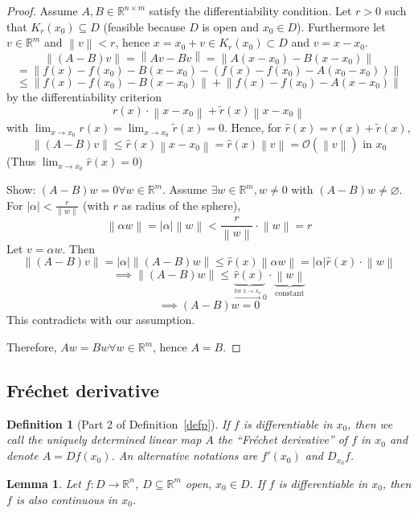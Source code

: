 \documentclass{article}
\newtheorem{definition}{Definition}  \numberwithin{definition}{section}
\newtheorem{lemma}{Lemma}  \numberwithin{lemma}{section}
\newcommand{\norm}[1]{\left\|#1\right\|}
\newcommand{\card}[1]{\left|#1\right|}
\begin{document}
\begin{proof}
  Assume $A, B \in \mathbb R^{n\times m}$ satisfy the differentiability condition.
  Let $r > 0$ such that $K_r(x_0) \subseteq D$ (feasible because $D$ is open and $x_0 \in D$).
  Furthermore let $v \in \mathbb R^m$ and $\norm{v} < r$, hence $x = x_0 + v \in K_r(x_0) \subset D$
  and $v = x - x_0$.
  \[ \norm{(A - B) v} = \norm{Av - Bv} = \norm{A(x - x_0) - B(x - x_0)} \]
  \[ = \norm{f(x) - f(x_0) - B(x - x_0) - (f(x) - f(x_0) - A(x_0 - x_0))} \]
  \[ \leq \norm{f(x) - f(x_0) - B(x - x_0)} + \norm{f(x) - f(x_0) - A(x - x_0)} \]
  by the differentiability criterion
  \[ r(x) \cdot \norm{x - x_0} + \tilde r(x) \norm{x - x_0} \]
  with $\lim_{x\to x_0} r(x) = \lim_{x\to x_0} \tilde r(x) = 0$. Hence, for $\hat r(x) = r(x) + \tilde r(x)$,
  \[ \norm{(A - B) v} \leq \hat r(x) \norm{x - x_0} = \hat r(x) \norm{v} = \mathcal O(\norm{v}) \text{ in } x_0 \]
  (Thus $\lim_{x\to x_0} \hat r(x) = 0$)

  Show: $(A - B)w = 0 \forall w \in \mathbb R^m$. Assume $\exists w \in \mathbb R^m, w \neq 0$ with $(A - B)w \neq \diameter$.
  For $\card{\alpha} < \frac r{\norm{w}}$ (with $r$ as radius of the sphere),
  \[ \norm{\alpha w} = \card{\alpha} \norm{w} < \frac{r}{\norm{w}} \cdot \norm{w} = r \]
  Let $v = \alpha w$. Then
  \[ \norm{(A - B) v} = \card{\alpha} \norm{(A - B) w} \leq \hat r(x) \norm{\alpha w} = \card{\alpha} \hat r(x) \cdot \norm{w} \]
  \[ \implies \norm{(A - B) w} \leq \underbrace{\hat r(x)}_{\xrightarrow{\text{for } x \to x_0} 0} \cdot \underbrace{\norm w}_{\text{constant}} \]
  \[ \implies (A - B) w = 0 \]
  This contradicts with our assumption.

  Therefore, $Aw = Bw \forall w \in \mathbb R^m$, hence $A = B$.
\end{proof}

\subsection{Fr\'echet derivative}
\begin{definition}[Part 2 of Definition~\ref{defp}] %
  If $f$ is differentiable in $x_0$, then we call the uniquely determined linear map $A$ the \enquote{Fr\'echet derivative} of $f$ in $x_0$
  and denote $A = Df(x_0)$. An alternative notations are $f'(x_0)$ and $D_{x_0}f$.
\end{definition}

\begin{lemma} %
  Let $f: D \to \mathbb R^n$, $D \subseteq \mathbb R^m$ open, $x_0 \in D$.
  If $f$ is differentiable in $x_0$, then $f$ is also continuous in $x_0$.
\end{lemma}
\end{document}

